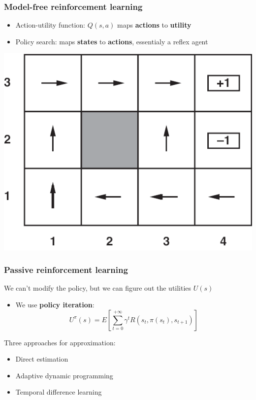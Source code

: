 \documentclass{beamer}
\begin{document}
\begin{frame}
	\frametitle{Model-free reinforcement learning}
	\begin{itemize}
		\item Action-utility function: $Q(s, a)$ maps \textbf{actions} to \textbf{utility}
		\item Policy search: maps \textbf{states} to \textbf{actions}, essentialy a reflex agent
	\end{itemize}
	\begin{center}
		\includegraphics[scale=0.8]{figures/optimal-policy-arrows.png}
	\end{center}
\end{frame}

\begin{frame}
	\frametitle{Passive reinforcement learning}
	We can't modify the policy, but we can figure out the utilities $U(s)$
	\begin{itemize}
		\item We use \textbf{policy iteration}:
			$$
				U^\pi(s) = E\left[ \sum_{t=0}^{+\infty} \gamma^t R(s_t, \pi(s_t), s_{t+1}) \right]
			$$
	\end{itemize}
	Three approaches for approximation:
	\begin{itemize}
		\item Direct estimation
		\item Adaptive dynamic programming
		\item Temporal difference learning
	\end{itemize}
\end{frame}
\end{document}
